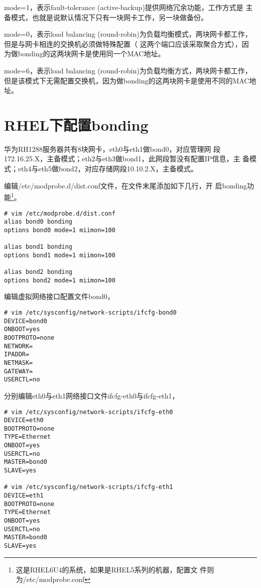 mode=1，表示fault-tolerance (active-backup)提供网络冗余功能，工作方式是
主备模式，也就是说默认情况下只有一块网卡工作，另一块做备份。
 
mode=0，表示load balancing (round-robin)为负载均衡模式，两块网卡都工作，
但是与网卡相连的交换机必须做特殊配置（ 这两个端口应该采取聚合方式），因
为做bonding的这两块网卡是使用同一个MAC地址。
 
mode=6，表示load balancing (round-robin)为负载均衡方式，两块网卡都工作，
但是该模式下无需配置交换机，因为做bonding的这两块网卡是使用不同的MAC地
址。
 
\section{RHEL下配置bonding}

华为RH1288服务器共有8块网卡，eth0与eth1做bond0，对应管理网
段172.16.25.X，主备模式；eth2与eth3做bond1，此网段暂没有配置IP信息，主
备模式；eth4与eth5做bond2，对应存储网段10.10.2.X，主备模式。

编辑/etc/modprobe.d/dist.conf文件，在文件末尾添加如下几行，开
启bonding功能\footnote{这是RHEL6U4的系统，如果是RHEL5系列的机器，配置文
  件则为/etc/modprobe.conf}。

\begin{verbatim}
# vim /etc/modprobe.d/dist.conf
alias bond0 bonding
options bond0 mode=1 miimon=100

alias bond1 bonding
options bond1 mode=1 miimon=100

alias bond2 bonding
options bond2 mode=1 miimon=100
\end{verbatim}

编辑虚拟网络接口配置文件bond0，

\begin{verbatim}
# vim /etc/sysconfig/network-scripts/ifcfg-bond0
DEVICE=bond0
ONBOOT=yes
BOOTPROTO=none
NETWORK=
IPADDR=
NETMASK=
GATEWAY=
USERCTL=no
\end{verbatim}

分别编辑eth0与eth1网络接口文件ifcfg-eth0与ifcfg-eth1，

\begin{verbatim}
# vim /etc/sysconfig/network-scripts/ifcfg-eth0
DEVICE=eth0
BOOTPROTO=none
TYPE=Ethernet
ONBOOT=yes
USERCTL=no
MASTER=bond0 
SLAVE=yes

# vim /etc/sysconfig/network-scripts/ifcfg-eth1
DEVICE=eth1
BOOTPROTO=none
TYPE=Ethernet
ONBOOT=yes
USERCTL=no
MASTER=bond0 
SLAVE=yes
\end{verbatim}

